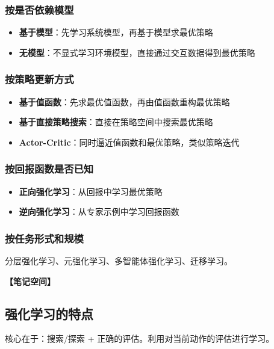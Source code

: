 \documentclass[12pt,a4paper]{article}
\newcommand{\notespace}[1][3cm]{%
  \vspace{#1}%
  \noindent\textbf{【笔记空间】}%
  \vspace{#1}%
}
\newcommand{\1}{\mathbf{1}}
\begin{document}
\subsubsection*{按是否依赖模型}

\begin{itemize}[leftmargin=2em]
  \item \textbf{基于模型}：先学习系统模型，再基于模型求最优策略
  \item \textbf{无模型}：不显式学习环境模型，直接通过交互数据得到最优策略
\end{itemize}

\subsubsection*{按策略更新方式}

\begin{itemize}[leftmargin=2em]
  \item \textbf{基于值函数}：先求最优值函数，再由值函数重构最优策略
  \item \textbf{基于直接策略搜索}：直接在策略空间中搜索最优策略
  \item \textbf{Actor-Critic}：同时逼近值函数和最优策略，类似策略迭代
\end{itemize}

\subsubsection*{按回报函数是否已知}

\begin{itemize}[leftmargin=2em]
  \item \textbf{正向强化学习}：从回报中学习最优策略
  \item \textbf{逆向强化学习}：从专家示例中学习回报函数
\end{itemize}

\subsubsection*{按任务形式和规模}

分层强化学习、元强化学习、多智能体强化学习、迁移学习。

\notespace[2cm]

\subsection{强化学习的特点}

\begin{keybox}
核心在于：搜索/探索 + 正确的评估。利用对当前动作的评估进行学习。
\end{keybox}
\end{document}
